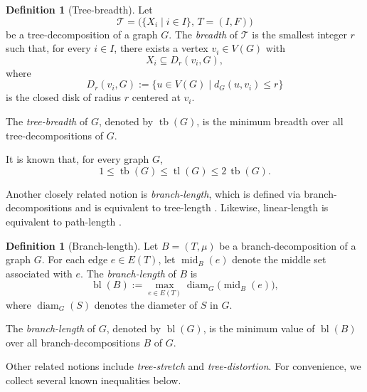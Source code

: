 \documentclass[10pt]{book}
\theoremstyle{definition}
\newtheorem{definition}[theorem]{Definition}
\DeclareMathOperator{\tl}{tl}
\DeclareMathOperator{\tb}{tb}
\begin{document}
\begin{definition}[Tree-breadth]
\cite{leitert2016strong,leitert2017tree}
Let
\[
\mathcal{T}=\bigl(\{X_i\mid i\in I\},\,T=(I,F)\bigr)
\]
be a tree-decomposition of a graph \(G\).  
The \emph{breadth} of \(\mathcal{T}\) is the smallest integer \(r\) such that, for every \(i\in I\), there exists a vertex \(v_i\in V(G)\) with
\[
X_i\subseteq D_r(v_i,G),
\]
where
\[
D_r(v_i,G):=\{u\in V(G)\mid d_G(u,v_i)\le r\}
\]
is the closed disk of radius \(r\) centered at \(v_i\).

The \emph{tree-breadth} of \(G\), denoted by \(\tb(G)\), is the minimum breadth over all tree-decompositions of \(G\).
\end{definition}

It is known that, for every graph \(G\),
\[
1\le \tb(G)\le \tl(G)\le 2\,\tb(G).
\]

Another closely related notion is \emph{branch-length}, which is defined via branch-decompositions and is equivalent to tree-length \cite{umezawa2009tree}.  
Likewise, linear-length is equivalent to path-length \cite{umezawa2009tree}.

\begin{definition}[Branch-length]
\cite{umezawa2009tree}
Let \(B=(T,\mu)\) be a branch-decomposition of a graph \(G\).  
For each edge \(e\in E(T)\), let \(\operatorname{mid}_B(e)\) denote the middle set associated with \(e\).  
The \emph{branch-length} of \(B\) is
\[
\operatorname{bl}(B)
:=
\max_{e\in E(T)} \operatorname{diam}_G\!\bigl(\operatorname{mid}_B(e)\bigr),
\]
where \(\operatorname{diam}_G(S)\) denotes the diameter of \(S\) in \(G\).

The \emph{branch-length} of \(G\), denoted by \(\operatorname{bl}(G)\), is the minimum value of \(\operatorname{bl}(B)\) over all branch-decompositions \(B\) of \(G\).
\end{definition}

Other related notions include \emph{tree-stretch} and \emph{tree-distortion}.  
For convenience, we collect several known inequalities below.
\end{document}
